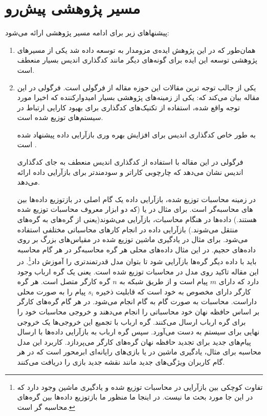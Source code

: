 \section{مسیر پژوهشی پیش‌رو}
پیشنهاهای زیر برای ادامه مسیر پژوهشی ارائه می‌شود:
\begin{enumerate}
	\item 
	همان‌طور که در این پژوهش ایده‌ی مزومدار به 
	\picod
	توسعه داده شد یکی از مسیرهای پژوهشی توسعه این ایده برای گونه‌های دیگر مانند کدگذاری اندیس بسیار منعطف است.
	\item 
	یکی از جالب توجه ترین مقالات این حوزه مقاله
	\cite{datashuf}
	از فرگولی است. فرگولی در این مقاله بیان می‌کند که: یکی از زمینه‌های پژوهشی بسیار امیدوارکننده که اخیرا مورد توجه واقع شده، استفاده از تکنیک‌های کدگذاری برای بهبود کارایی ارتباط در سیستم‌های توزیع شده است.
	\cite{Li2015CodedM, 7841903, 8002642, 8051074}
	
	به طور خاص کدگذاری اندیس برای افزایش بهره وری بازآرایی داده پیشنهاد شده است
	\cite{8002642, 8051074}. 

فرگولی در این مقاله با استفاده از کدگذاری اندیس منعطف به جای کدگذاری اندیس نشان می‌دهد که 
\picod
چارچوبی کاراتر و سودمندتر برای بازآرایی داده ارائه می‌دهد.

در زمینه محاسبات توزیع شده، بازآرایی داده یک گام اصلی در بازتوزیع داده‌ها بین 
های محاسبه‌گر است. برای مثال در
یا
(که دو ابزار معروف محاسبات توزیع شده هستند.) داده‌ها در هنگام محاسبات، بازآرایی می‌شوند(یعنی از گره‌های 
 به گره‌های 
 منتقل می‌شوند.) بازآرایی داده در انجام کارهای محاسباتی مختلفی استفاده می‌شود. برای مثال در یادگیری ماشین توزیع شده در مقیاس‌های بزرگ بر روی داده‌های حجیم. در این مثال داده‌های محلی هر گره محاسبه‌گر در هر گام محاسبه باید با داده دیگر گره‌ها بازآرایی شود تا بتوان مدل قدرتمندتری را آموزش
 داد\footnote{تفاوت کوچکی بین بازآرایی در محاسبات توزیع شده و یادگیری ماشین وجود دارد که در این جا مورد بحث ما نیست. در اینجا ما منظور ما بازتوزیع داده‌ها بین گره‌های محاسبه گر است.}.
 در این مقاله تاکید روی مدل
 در محاسبات توزیع شده است. یعنی یک گره ارباب وجود دارد که دارای
 $m$
 پیام است و از طریق شبکه به
 $n$
 گره کارگر متصل است. هر گره کارگر دارای
 مخصوص به خود است که قابلیت ذخیره
 $s_i$
پیام را به صورت محلی داراست. محاسبات به صورت گام به گام انجام می‌شود. در هر گام گره‌های کارگر بر اساس حافظه نهان خود محاسباتی را انجام می‌دهند و خروجی محاسبات خود را برای گره ارباب ارسال می‌کنند. گره ارباب با تجمیع این خروجی‌ها یک خروجی نهایی برای سیستم به دست می‌آورد. سپس گره ارباب به بازآرایی داده‌ها با ارسال پیام‌های جدید برای تجدید حافظه نهان گره‌های کارگر می‌پردازد. کاربرد این مدل محاسبه برای مثال، یادگیری ماشین در 
یا بازی‌های رایانه‌ای ابرمحور است که در هر گام کاربران ویژگی‌های جدید مانند نقشه جدید بازی را دریافت می‌کنند.


\end{enumerate}
